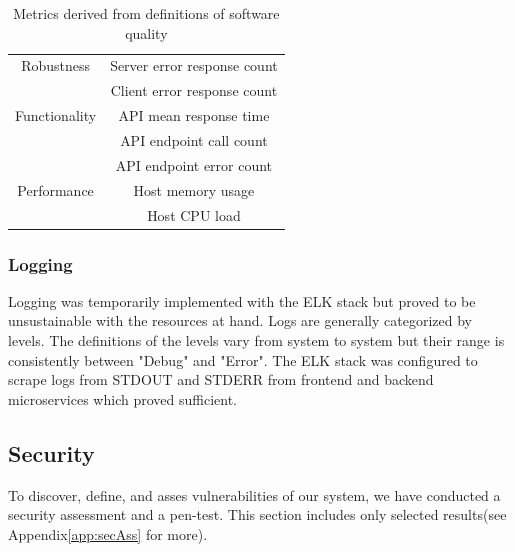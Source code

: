 \begin{table}[H]
    \centering
    \begin{tabular}{|c|c|} \hline
        Robustness & Server error response count \\
        & Client error response count \\ \hline
        Functionality & API mean response time  \\ 
        & API endpoint call count \\
        & API endpoint error count  \\ \hline
        Performance & Host memory usage \\
        & Host CPU load \\ \hline
    \end{tabular}
    \caption{Metrics derived from definitions of software quality}
    \label{tab:metrics}
\end{table}

\subsubsection{Logging}
Logging was temporarily implemented with the ELK stack but proved to be unsustainable with the resources at hand.
Logs are generally categorized by levels. 
The definitions of the levels vary from system to system but their range is consistently between "Debug" and "Error".
The ELK stack was configured to scrape logs from STDOUT and STDERR from frontend and backend microservices which proved sufficient.

\subsection{Security}
\label{subsec:security}
To discover, define, and asses vulnerabilities of our system, we have conducted a security assessment and a pen-test. This section includes only selected results(see Appendix\ref{app:secAss} for more).

